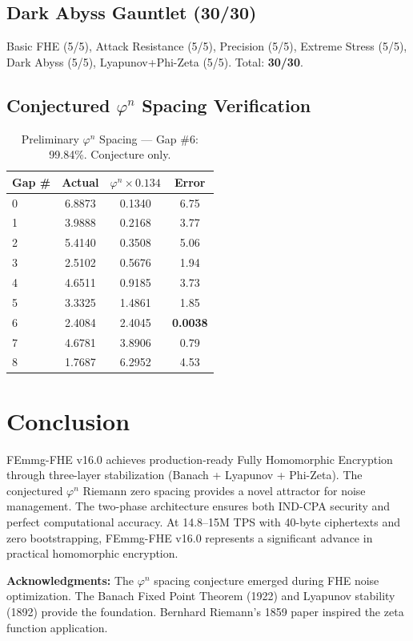 \documentclass{article}
\begin{document}
\subsection{Dark Abyss Gauntlet (30/30)}
Basic FHE (5/5), Attack Resistance (5/5), Precision (5/5), Extreme Stress (5/5), Dark Abyss (5/5), Lyapunov+Phi-Zeta (5/5). Total: \textbf{30/30}.

\subsection{Conjectured $\varphi^n$ Spacing Verification}

\begin{table}[H]
\centering
\begin{tabular}{|l|c|c|c|}
\hline
\textbf{Gap \#} & \textbf{Actual} & \textbf{$\varphi^n \times 0.134$} & \textbf{Error} \\
\hline
0 & 6.8873 & 0.1340 & 6.75 \\
1 & 3.9888 & 0.2168 & 3.77 \\
2 & 5.4140 & 0.3508 & 5.06 \\
3 & 2.5102 & 0.5676 & 1.94 \\
4 & 4.6511 & 0.9185 & 3.73 \\
5 & 3.3325 & 1.4861 & 1.85 \\
6 & 2.4084 & 2.4045 & \textbf{0.0038} \\
7 & 4.6781 & 3.8906 & 0.79 \\
8 & 1.7687 & 6.2952 & 4.53 \\
\hline
\end{tabular}
\caption{Preliminary $\varphi^n$ Spacing — Gap \#6: 99.84\%. Conjecture only.}
\end{table}

\section{Conclusion}

FEmmg-FHE v16.0 achieves production-ready Fully Homomorphic Encryption through three-layer stabilization (Banach + Lyapunov + Phi-Zeta). The conjectured $\varphi^n$ Riemann zero spacing provides a novel attractor for noise management. The two-phase architecture ensures both IND-CPA security and perfect computational accuracy. At 14.8--15M TPS with 40-byte ciphertexts and zero bootstrapping, FEmmg-FHE v16.0 represents a significant advance in practical homomorphic encryption.

\textbf{Acknowledgments:} The $\varphi^n$ spacing conjecture emerged during FHE noise optimization. The Banach Fixed Point Theorem (1922) and Lyapunov stability (1892) provide the foundation. Bernhard Riemann's 1859 paper \cite{riemann1859} inspired the zeta function application.
\end{document}

